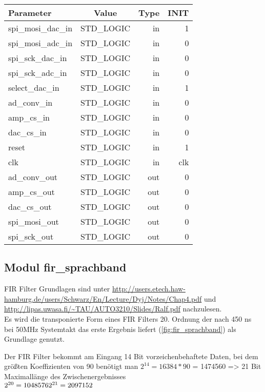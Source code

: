 \begin{table}[H]
	\centering
	\begin{tabular}{|l|c|r|r|}
		\hline
		\rowcolor{green}Parameter & Value & Type & INIT\\
		\hline
		spi\_mosi\_dac\_in & STD\_LOGIC & in & 1\\
		\hline
		spi\_mosi\_adc\_in & STD\_LOGIC & in & 0\\
		\hline
		spi\_sck\_dac\_in & STD\_LOGIC & in& 0\\
		\hline
		spi\_sck\_adc\_in & STD\_LOGIC & in& 0\\
		\hline
		select\_dac\_in & STD\_LOGIC & in& 1\\
		\hline
		ad\_conv\_in & STD\_LOGIC & in& 0\\
		\hline
		amp\_cs\_in & STD\_LOGIC & in& 0\\
		\hline
		dac\_cs\_in & STD\_LOGIC & in& 0\\
		\hline
		reset & STD\_LOGIC & in& 1\\
		\hline
		clk & STD\_LOGIC & in & clk\\
		\hline
		ad\_conv\_out & STD\_LOGIC & out & 0\\
		\hline
		amp\_cs\_out & STD\_LOGIC & out & 0\\
		\hline
		dac\_cs\_out & STD\_LOGIC & out & 0\\
		\hline
		spi\_mosi\_out & STD\_LOGIC & out & 0\\
		\hline
		spi\_sck\_out & STD\_LOGIC & out & 0\\
		\hline
	\end{tabular}
\end{table}

\subsection{Modul fir\_sprachband} \label{sprachband}
FIR Filter Grundlagen sind unter \url {http://users.etech.haw-hamburg.de/users/Schwarz/En/Lecture/Dyj/Notes/Chap4.pdf} und \url {http://lipas.uwasa.fi/~TAU/AUTO3210/Slides/Ralf.pdf} nachzulesen. \\
Es wird die transponierte Form eines FIR Filters 20. Ordnung der nach 450 ns bei 50MHz Systemtakt das erste Ergebnis liefert (\ref{fig:fir_sprachband}) als Grundlage genutzt. 

Der FIR Filter bekommt am Eingang 14 Bit vorzeichenbehaftete Daten, bei dem größten Koeffizienten von 90 benötigt man \begin{math}
2^{14}=   16384 * 90 
\end{math}
= 1474560 => 21 Bit Maximallänge des Zwischenergebnisses\\
\begin{math}
2^{20} =	1048576\\
2^{21} =	2097152
\end{math}



